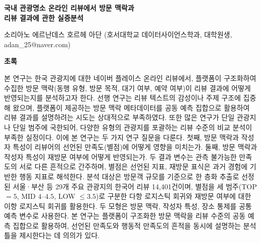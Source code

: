 \documentclass[10pt,a4paper]{article}
\begin{document}
\clearpage
\setcounter{table}{0}
\setcounter{figure}{0}

\begin{center}
{\Large\textbf{국내 관광명소 온라인 리뷰에서 방문 맥락과\\[2pt]
리뷰 결과에 관한 실증분석}}

\vspace{12pt}

{\normalsize *소리아노 에르난데스 호르헤 아단 (호서대학교 데이터사이언스학과,
대학원생, adan\_25@naver.com)}

\end{center}

\vspace{10pt}

\noindent\textbf{\large 초록}

\vspace{4pt}

\noindent
본 연구는 한국 관광지에 대한 네이버 플레이스 온라인 리뷰에서, 플랫폼이 구조화하여
수집한 방문 맥락(동행 유형, 방문 목적, 대기 여부, 예약 여부)이 리뷰 결과에 어떻게
반영되는지를 분석하고자 한다. 선행 연구는 리뷰 텍스트의 감성이나 주제 구조에
집중해 왔으며, 플랫폼이 제공하는 방문 맥락 메타데이터를 공동 예측 집합으로 활용하여
리뷰 결과를 설명하려는 시도는 상대적으로 부족하였다. 또한 많은 연구가 단일 관광지나
단일 범주에 국한되어, 다양한 유형의 관광지를 포괄하는 리뷰 수준의 비교 분석이
부족한 실정이다. 이에 본 연구는 두 가지 연구 질문을 다룬다. 첫째, 방문 맥락과
작성자 특성이 리뷰어의 선언된 만족도(별점)에 어떻게 영향을 미치는가. 둘째, 방문
맥락과 작성자 특성이 재방문 여부에 어떻게 반영되는가. 두 결과 변수는 관측 불가능한
만족도의 서로 다른 흔적으로 간주하며, 별점은 선언된 지표, 재방문 표식은 과거
경험에 기반한 행동 지표로 해석한다. 분석 대상은 방문객 규모를 기준으로 한 층화
추출로 선정된 서울·부산 등 29개 주요 관광지의 한국어 리뷰 14{,}401건이며, 별점을
세 범주(TOP $=5$\textbigstar, MID $4$--$4.5$\textbigstar, LOW $\le 3.5$\textbigstar)로
구분한 다항 로지스틱 회귀와 재방문 여부에 대한 이항 로지스틱 회귀를 활용한다.
두 모형은 방문 맥락, 작성자 특성, 장소 통제를 공통 예측 변수로 사용한다. 본
연구는 플랫폼이 구조화한 방문 맥락을 리뷰 수준의 공동 예측 집합으로 활용하여,
선언된 만족도와 행동적 만족도의 흔적을 동시에 설명하는 분석 틀을 제시한다는
데 의의가 있다.

\vspace{6pt}
\end{document}
